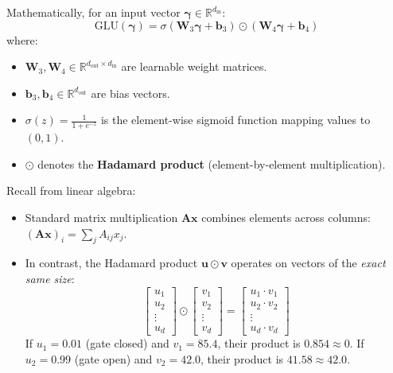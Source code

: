 \documentclass[11pt,a4paper]{article}
\begin{document}
Mathematically, for an input vector $\boldsymbol{\gamma} \in \mathbb{R}^{d_{\text{in}}}$:
\begin{equation}
    \mathrm{GLU}(\boldsymbol{\gamma}) = \sigma\left(\mathbf{W}_3 \boldsymbol{\gamma} + \mathbf{b}_3\right) \odot \left(\mathbf{W}_4 \boldsymbol{\gamma} + \mathbf{b}_4\right)
\end{equation}
where:
\begin{itemize}
    \item $\mathbf{W}_3, \mathbf{W}_4 \in \mathbb{R}^{d_{\text{out}} \times d_{\text{in}}}$ are learnable weight matrices.
    \item $\mathbf{b}_3, \mathbf{b}_4 \in \mathbb{R}^{d_{\text{out}}}$ are bias vectors.
    \item $\sigma(z) = \frac{1}{1 + e^{-z}}$ is the element-wise sigmoid function mapping values to $(0, 1)$.
    \item $\odot$ denotes the \textbf{Hadamard product} (element-by-element multiplication).
\end{itemize}

\begin{mathcheck}
Recall from linear algebra:
\begin{itemize}
    \item Standard matrix multiplication $\mathbf{A} \mathbf{x}$ combines elements across columns: $(\mathbf{A}\mathbf{x})_i = \sum_j A_{ij} x_j$.
    \item In contrast, the Hadamard product $\mathbf{u} \odot \mathbf{v}$ operates on vectors of the \textit{exact same size}:
    \begin{equation}
        \begin{bmatrix} u_1 \\ u_2 \\ \vdots \\ u_d \end{bmatrix} \odot \begin{bmatrix} v_1 \\ v_2 \\ \vdots \\ v_d \end{bmatrix} = \begin{bmatrix} u_1 \cdot v_1 \\ u_2 \cdot v_2 \\ \vdots \\ u_d \cdot v_d \end{bmatrix}
    \end{equation}
    If $u_1 = 0.01$ (gate closed) and $v_1 = 85.4$, their product is $0.854 \approx 0$. If $u_2 = 0.99$ (gate open) and $v_2 = 42.0$, their product is $41.58 \approx 42.0$.
\end{itemize}
\end{mathcheck}
\end{document}
